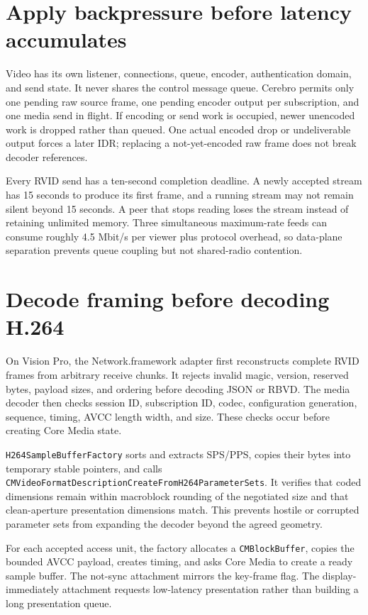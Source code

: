 \documentclass[10pt,openany]{book}
\begin{document}
\section{Apply backpressure before latency accumulates}

Video has its own listener, connections, queue, encoder, authentication domain, and send state. It never shares the control message queue. Cerebro permits only one pending raw source frame, one pending encoder output per subscription, and one media send in flight. If encoding or send work is occupied, newer unencoded work is dropped rather than queued. One actual encoded drop or undeliverable output forces a later IDR; replacing a not-yet-encoded raw frame does not break decoder references.

Every RVID send has a ten-second completion deadline. A newly accepted stream has 15 seconds to produce its first frame, and a running stream may not remain silent beyond 15 seconds. A peer that stops reading loses the stream instead of retaining unlimited memory. Three simultaneous maximum-rate feeds can consume roughly 4.5 Mbit/s per viewer plus protocol overhead, so data-plane separation prevents queue coupling but not shared-radio contention.

\section{Decode framing before decoding H.264}

On Vision Pro, the Network.framework adapter first reconstructs complete RVID frames from arbitrary receive chunks. It rejects invalid magic, version, reserved bytes, payload sizes, and ordering before decoding JSON or RBVD. The media decoder then checks session ID, subscription ID, codec, configuration generation, sequence, timing, AVCC length width, and size. These checks occur before creating Core Media state.

\texttt{H264SampleBufferFactory} sorts and extracts SPS/PPS, copies their bytes into temporary stable pointers, and calls \texttt{CMVideoFormatDescriptionCreateFromH264ParameterSets}. It verifies that coded dimensions remain within macroblock rounding of the negotiated size and that clean-aperture presentation dimensions match. This prevents hostile or corrupted parameter sets from expanding the decoder beyond the agreed geometry.

For each accepted access unit, the factory allocates a \texttt{CMBlockBuffer}, copies the bounded AVCC payload, creates timing, and asks Core Media to create a ready sample buffer. The not-sync attachment mirrors the key-frame flag. The display-immediately attachment requests low-latency presentation rather than building a long presentation queue.
\end{document}
